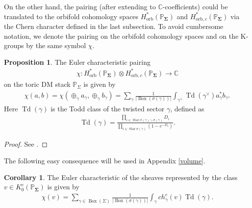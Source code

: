 \documentclass[11pt,reqno]{amsart}
\def\C {{\mathbb C}}
\def\CC {{\mathbb C}}
\def\PP {{\mathbb P}}
\theoremstyle{definition}
\newtheorem{proposition}[theorem]{Proposition}
\newtheorem{corollary}[theorem]{Corollary}
\numberwithin{equation}{section}
\begin{document}
\smallskip

On the other hand, the pairing (after extending to $\CC$-coefficients) could be translated to the orbifold cohomology spaces $H_{\mathrm{orb}}^*(\PP_{\mathbf{\Sigma}})$ and $H_{\mathrm{orb},c}^*(\PP_{\mathbf{\Sigma}})$ via the Chern character defined in the last subsection. To avoid cumbersome notation, we denote the pairing on the orbifold cohomology spaces and on the K-groups by the same symbol $\chi$.

\smallskip


\begin{proposition}\label{def-eulerpairing}
The Euler characteristic pairing
\begin{align*}
	\chi:H_{\mathrm{orb}}^*(\PP_{\mathbf{\Sigma}})\otimes H_{\mathrm{orb},c}^*(\PP_{\mathbf{\Sigma}})\rightarrow\C
\end{align*}
on the toric DM stack $\mathbb{P}_{\Sigma}$ is given by
	\begin{align*}
		\chi(a,b)=\chi(\oplus_{\gamma}a_{\gamma},\oplus_{\gamma}b_{\gamma})=\sum_{\gamma}\frac{1}{|\operatorname{Box}(\sigma(\gamma))|}\int_{\gamma^{\vee}}\operatorname{Td}(\gamma^{\vee})a_{\gamma}^*b_{\gamma^{\vee}}
	\end{align*}
	Here $\operatorname{Td}(\gamma)$ is the Todd class of the twisted sector $\gamma$, defined as
	\begin{align*}
		\operatorname{Td}(\gamma)=\frac{\prod_{i\in\operatorname{Star}\sigma(\gamma)\backslash\sigma(\gamma)}D_i}{\prod_{i\in\operatorname{Star}\sigma(\gamma)}(1-e^{-D_i})}.
	\end{align*}
\end{proposition}
\begin{proof}
	See \cite[Lemma 4.20]{BHW}.
\end{proof}

\smallskip

The following easy consequence will be used in Appendix \ref{volume}.

\smallskip

\begin{corollary}\label{formula of euler characteristic}
	The Euler characteristic of the sheaves represented by the class $v\in K_0^c(\PP_{\mathbf{\Sigma}})$ is given by
	\begin{align*}
		\chi(v) = \sum_{\gamma\in\operatorname{Box}(\Sigma)}\frac{1}{|\operatorname{Box}(\sigma(\gamma))|}\int_{\gamma}ch_{\gamma}^c(v)\operatorname{Td}(\gamma).
	\end{align*}
\end{corollary}
\end{document}
